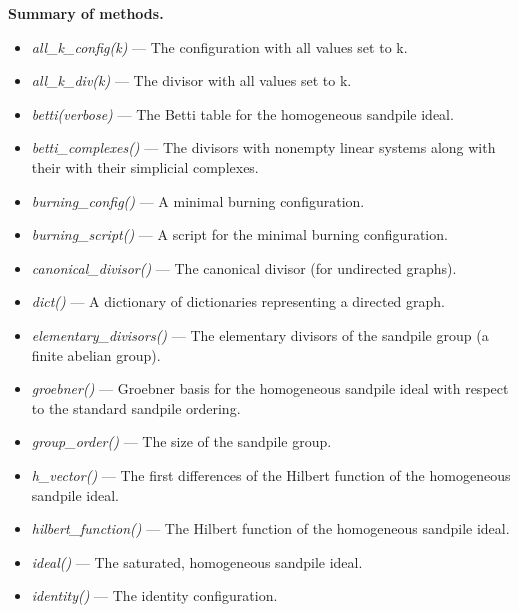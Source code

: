 \documentclass[letterpaper,10pt,english]{manual}
\begin{document}
\textbf{Summary of methods.}
\begin{itemize}
\item {} 
\emph{all\_k\_config(k)} --- The configuration with all values set to k.

\item {} 
\emph{all\_k\_div(k)} --- The divisor with all values set to k.

\item {} 
\emph{betti(verbose)} --- The Betti table for the
homogeneous sandpile ideal.

\item {} 
\emph{betti\_complexes()} --- The divisors with
nonempty linear systems along with their with their simplicial complexes.

\item {} 
\emph{burning\_config()} --- A minimal burning configuration.

\item {} 
\emph{burning\_script()} --- A script for the minimal burning configuration.

\item {} 
\emph{canonical\_divisor()} --- The canonical divisor (for undirected graphs).

\item {} 
\emph{dict()} --- A dictionary of dictionaries representing a directed graph.

\item {} 
\emph{elementary\_divisors()} --- The elementary
divisors of the sandpile group (a finite abelian group).

\item {} 
\emph{groebner()} --- Groebner basis for the homogeneous
sandpile ideal with respect to the standard sandpile ordering.

\item {} 
\emph{group\_order()} --- The size of the sandpile group.

\item {} 
\emph{h\_vector()} --- The first differences of the
Hilbert function of the homogeneous sandpile ideal.

\item {} 
\emph{hilbert\_function()} --- The Hilbert function of the homogeneous sandpile ideal.

\item {} 
\emph{ideal()} --- The saturated, homogeneous sandpile ideal.

\item {} 
\emph{identity()} --- The identity configuration.


\end{itemize}
\end{document}
